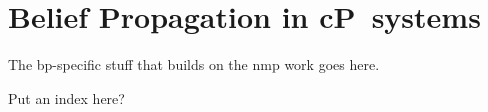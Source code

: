 \documentclass[11pt,partial]{aucklandthesis}
\theoremstyle{plain}
\begin{document}
\chapter{Belief Propagation in cP~systems}
The \gls{bp}-specific stuff that builds on the \gls{nmp} work goes here.
\glsresetall

\glsresetall
% 
% 
% 

\glsresetall

% 
% 

%
%
%

\printbibliography[title={Works Cited}, heading=bibintoc]

\printglossary
 
\printglossary[type=\acronymtype]

\cleardoublepage
Put an index here?

%  
\end{document}

